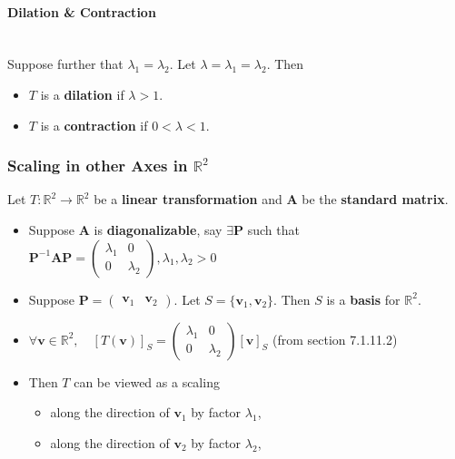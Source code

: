 \documentclass[../ma2001_notes.tex]{subfiles}
\begin{document}
\paragraph{Dilation \& Contraction}\,\\
Suppose further that \(\lambda_1=\lambda_2\). Let \(\lambda=\lambda_1=\lambda_2\). Then
\begin{itemize}
	\item\(T\) is a \textbf{dilation} if \(\lambda>1\).
	\item\(T\) is a \textbf{contraction} if \(0<\lambda<1\).
\end{itemize}

\subsubsection{Scaling in other Axes in $\mathbb{R}^2$}
Let \(T:\mathbb{R}^2\to\mathbb{R}^2\) be a \textbf{linear transformation} and \(\bm{A}\) be the \textbf{standard matrix}.
\begin{itemize}
	\item Suppose \(\bm{A}\) is \textbf{diagonalizable}, say \(\exists\bm{P}\) such that \(\bm{P}^{-1}\bm{AP}=\begin{pmatrix}
		\lambda_1 & 0 \\ 0 & \lambda_2
	\end{pmatrix},\lambda_1,\lambda_2>0\)
	\item Suppose \(\bm{P}=\begin{pmatrix}
		\bm{v}_1 & \bm{v}_2
	\end{pmatrix}\). Let \(S=\{\bm{v}_1,\bm{v}_2\}\). Then \(S\) is a \textbf{basis} for \(\mathbb{R}^2\).
	\item\(\forall\bm{v}\in\mathbb{R}^2,\quad[T(\bm{v})]_S=\begin{pmatrix}
		\lambda_1 & 0 \\ 0 & \lambda_2
	\end{pmatrix}[\bm{v}]_S\) (from section 7.1.11.2)
	\item Then \(T\) can be viewed as a scaling
	\begin{itemize}
		\item along the direction of \(\bm{v}_1\) by factor \(\lambda_1\),
		\item along the direction of \(\bm{v}_2\) by factor \(\lambda_2\),
	\end{itemize}
\end{itemize}
\end{document}
